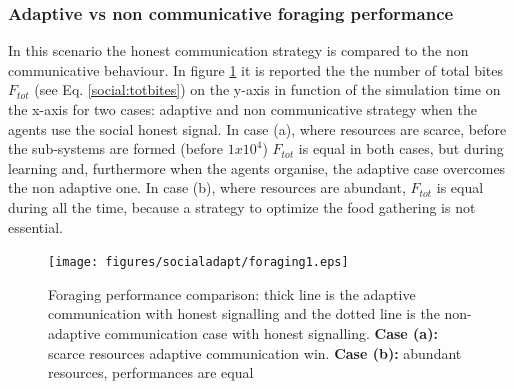 \subsubsection{Adaptive vs non communicative foraging performance}
In this scenario the honest communication strategy is compared to the non 
communicative behaviour. In figure \ref{fig:foraging1} it is reported the  
the number of total bites $F_{tot}$ (see Eq. \ref{social:totbites}) on the y-axis
in function of the simulation time on the x-axis for two cases: 
adaptive and non communicative strategy when the agents use the social honest signal. 
In case (a), where resources are scarce, before the sub-systems are formed 
(before $1x10^{4}$) $F_{tot}$ is equal in both cases, but during learning and, 
furthermore when the agents organise, the adaptive case overcomes the non
 adaptive one. In case (b), where resources are abundant, $F_{tot}$ is 
equal during all the time, because a strategy to optimize the food gathering
 is not essential.

\begin{figure}[htbp]
\begin{center}
\texttt{[image: figures/socialadapt/foraging1.eps]}
\end{center}
\vspace*{4pt}
\caption[Foraging performance comparison]{Foraging performance comparison:
thick line is the adaptive communication with honest signalling and the
dotted line is the non-adaptive communication case with honest signalling.
\textbf{Case (a):} scarce resources adaptive communication win.
\textbf{Case (b):} abundant resources, performances are equal
\label{fig:foraging1}}
\end{figure}


